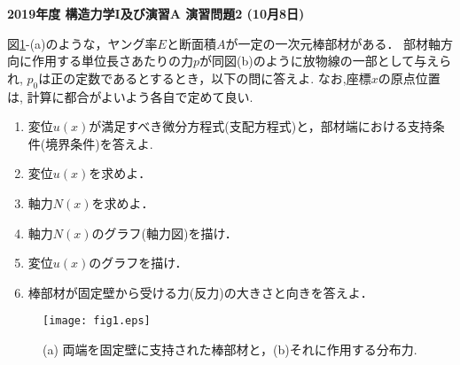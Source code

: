 \documentclass[10pt,a4j]{jarticle}
\newlength{\minitwocolumn}
\begin{document}
\newcommand{\fat}[1]{\mbox{\boldmath $#1$}}
\newcommand{\D}{\partial}
\newcommand{\w}{\omega}
\newcommand{\ga}{\alpha}
\newcommand{\gb}{\beta}
\newcommand{\gx}{\xi}
\newcommand{\gz}{\zeta}
\newcommand{\vhat}[1]{\hat{\fat{#1}}}
\newcommand{\spc}{\vspace{0.7\baselineskip}}
\newcommand{\halfspc}{\vspace{0.3\baselineskip}}

\pagestyle{empty}
\newcommand{\twofig}[2]
 {
   \begin{figure}
     \begin{minipage}[t]{\minitwocolumn}
         \begin{center}   #1
         \end{center}
     \end{minipage}
         \hspace{\columnsep}
     \begin{minipage}[t]{\minitwocolumn}
         \begin{center} #2
         \end{center}
     \end{minipage}
   \end{figure}
 }
\begin{center}
	{\Large \bf 2019年度 構造力学I及び演習A 演習問題2 (10月8日)} \\
\end{center}
\vspace{15mm}
図\ref{fig:fig1}-(a)のような，ヤング率$E$と断面積$A$が一定の一次元棒部材がある．
部材軸方向に作用する単位長さあたりの力$p$が同図(b)のように放物線の一部として与えられ,
$p_0$は正の定数であるとするとき，以下の問に答えよ.
なお,座標$x$の原点位置は, 計算に都合がよいよう各自で定めて良い.
\begin{enumerate}
\item
	変位$u(x)$が満足すべき微分方程式(支配方程式)と，部材端における支持条件(境界条件)を答えよ. 
\item
	変位$u(x)$を求めよ．
\item
	軸力$N(x)$を求めよ．
\item
	軸力$N(x)$のグラフ(軸力図)を描け．
\item
	変位$u(x)$のグラフを描け．
\item
	棒部材が固定壁から受ける力(反力)の大きさと向きを答えよ．
\end{enumerate}
\begin{figure}[h]
	\vspace{-3mm}
	\begin{center}
	\texttt{[image: fig1.eps]} 
	\end{center}
	\vspace{-5mm}
	\caption{(a) 両端を固定壁に支持された棒部材と，(b)それに作用する分布力.} 
	\label{fig:fig1}
\end{figure}
\end{document}
